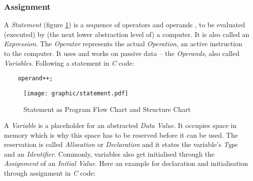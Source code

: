 %
%
%
%
%
%
%

\subsubsection{Assignment}
\label{assignment_heading}

A \emph{Statement} (figure \ref{statement_figure}) is a sequence of operators
and operands \cite{cmanual}, to be evaluated (executed) by (the next lower
abstraction level of) a computer. It is also called an \emph{Expression}. The
\emph{Operator} represents the actual \emph{Operation}, an active instruction
to the computer. It uses and works on passive data -- the \emph{Operands}, also
called \emph{Variables}. Following a statement in \emph{C} code:

\begin{scriptsize}
    \begin{verbatim}
    operand++;
    \end{verbatim}
\end{scriptsize}

\begin{figure}[ht]
    \begin{center}
        \texttt{[image: graphic/statement.pdf]}
        \caption{Statement as Program Flow Chart and Structure Chart}
        \label{statement_figure}
    \end{center}
\end{figure}

A \emph{Variable} is a placeholder for an abstracted \emph{Data Value}. It
occupies space in memory which is why this space has to be reserved before it
can be used. The reservation is called \emph{Allocation} or \emph{Declaration}
and it states the variable's \emph{Type} and an \emph{Identifier}. Commonly,
variables also get initialised through the \emph{Assignment} of an
\emph{Initial Value}. Here an example for declaration and initialisation
through assignment in \emph{C} code:

